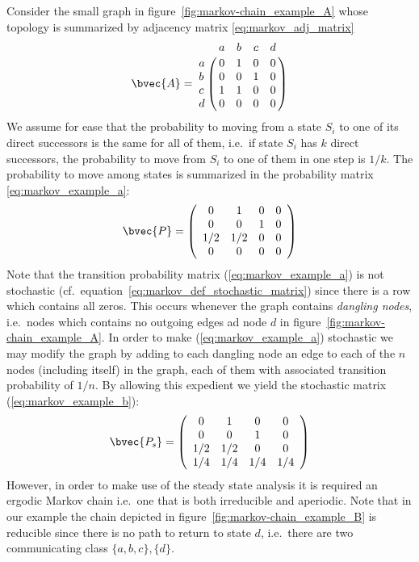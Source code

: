 Consider the small graph in figure~\ref{fig:markov-chain_example_A} whose topology is summarized by adjacency matrix \ref{eq:markov_adj_matrix} 
\begin{equation}\label{eq:markov_adj_matrix}
\bvec{A} = 
\bordermatrix{
  & a & b & c & d \cr
a & 0 & 1 & 0 & 0 \cr
b & 0 & 0 & 1 & 0 \cr
c & 1 & 1 & 0 & 0 \cr
d & 0 & 0 & 0 & 0 \cr}
\end{equation}
We assume for ease that the probability to moving from a state $S_i$ to one of its direct successors is the same for all of them, i.e.\ if state $S_i$ has $k$ direct successors, the probability to move from $S_i$ to one of them in one step is $1/k$. The probability to move among states is summarized in the probability matrix \ref{eq:markov_example_a}:
\begin{equation}\label{eq:markov_example_a}
\bvec{P} =
 \left(
 \begin{array}{cccc}
  0   & 1   & 0 & 0 \\
  0   & 0   & 1 & 0 \\
  1/2 & 1/2 & 0 & 0 \\
  0   & 0   & 0 & 0 \\
 \end{array}
 \right)
\end{equation}
Note that the transition probability matrix (\ref{eq:markov_example_a}) is not stochastic (cf.\ equation~\ref{eq:markov_def_stochastic_matrix}) since there is a row which contains all zeros. This occurs whenever the graph contains \textit{dangling nodes}, i.e.\ nodes which contains no outgoing edges ad node $d$ in figure~\ref{fig:markov-chain_example_A}. In order to make (\ref{eq:markov_example_a}) stochastic we may modify the graph by adding to each dangling node an edge to each of the  $n$ nodes (including itself) in the graph, each of them with associated transition probability of $1/n$. By allowing this expedient we yield the stochastic matrix (\ref{eq:markov_example_b}):
\begin{equation}\label{eq:markov_example_b}
\bvec{P_s} =
 \left(
 \begin{array}{cccc}
  0   & 1   & 0 & 0 \\
  0   & 0   & 1 & 0 \\
  1/2 & 1/2 & 0 & 0 \\
  1/4 & 1/4 & 1/4 & 1/4 \\
 \end{array}
 \right)
\end{equation}
However, in order to make use of the steady state analysis it is required an ergodic Markov chain i.e.\ one that is both irreducible and aperiodic. Note that in our example the chain depicted in figure~\ref{fig:markov-chain_example_B} is reducible since there is no path to return to state $d$, i.e.\ there are two communicating class $\{a,b,c\},\{d\}$.


